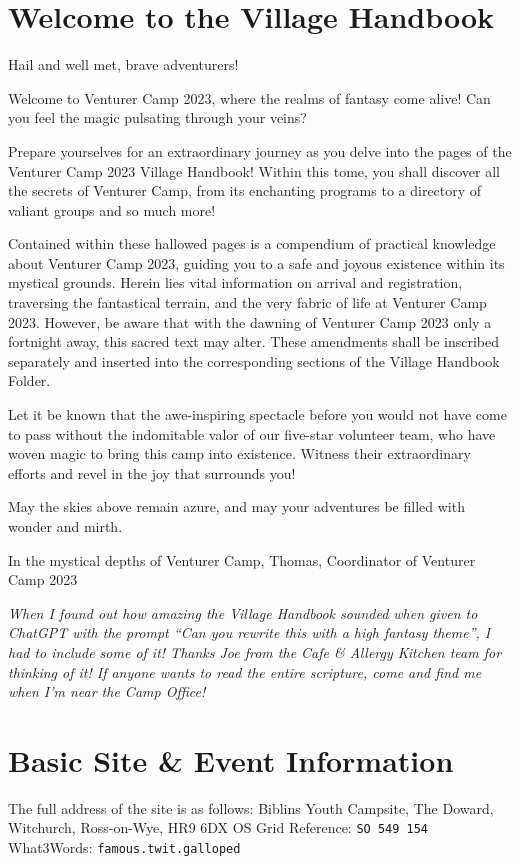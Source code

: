 \documentclass[a4paper, 11pt]{report}
\begin{document}
\tableofcontents
\chapter{Welcome to the Village Handbook}
Hail and well met, brave adventurers!\nl

Welcome to Venturer Camp 2023, where the realms of fantasy come alive! Can you feel the magic pulsating through your veins?\nl

Prepare yourselves for an extraordinary journey as you delve into the pages of the Venturer Camp 2023 Village Handbook! Within this tome, you shall discover all the secrets of Venturer Camp, from its enchanting programs to a directory of valiant groups and so much more!\nl

Contained within these hallowed pages is a compendium of practical knowledge about Venturer Camp 2023, guiding you to a safe and joyous existence within its mystical grounds. Herein lies vital information on arrival and registration, traversing the fantastical terrain, and the very fabric of life at Venturer Camp 2023. However, be aware that with the dawning of Venturer Camp 2023 only a fortnight away, this sacred text may alter. These amendments shall be inscribed separately and inserted into the corresponding sections of the Village Handbook Folder.\nl

Let it be known that the awe-inspiring spectacle before you would not have come to pass without the indomitable valor of our five-star volunteer team, who have woven magic to bring this camp into existence. Witness their extraordinary efforts and revel in the joy that surrounds you!\nl

May the skies above remain azure, and may your adventures be filled with wonder and mirth.\nl

In the mystical depths of Venturer Camp,\nl
Thomas,\nl
Coordinator of Venturer Camp 2023\nl

\textit{When I found out how amazing the Village Handbook sounded when given to ChatGPT with the prompt ``Can you rewrite this with a high fantasy theme'', I had to include some of it! Thanks Joe from the Cafe \& Allergy Kitchen team for thinking of it!\nl
If anyone wants to read the entire scripture, come and find me when I'm near the Camp Office!}


\chapter{Basic Site \& Event Information}
The full address of the site is as follows:\nl
Biblins Youth Campsite,\nl
The Doward,\nl
Witchurch,\nl
Ross-on-Wye,\nl
HR9 6DX\nl
OS Grid Reference: \texttt{SO 549 154}\nl
What3Words: \texttt{famous.twit.galloped}\nl
\end{document}
